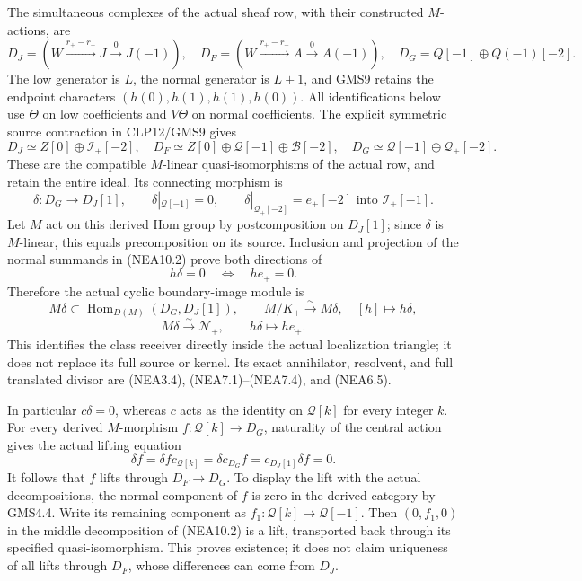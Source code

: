 The simultaneous complexes of the actual sheaf row, with their
constructed \(M\)-actions, are \[
D_J=(W\xrightarrow{r_+-r_-}J\xrightarrow0J(-1)),\quad
D_F=(W\xrightarrow{r_+-r_-}A\xrightarrow0A(-1)),\quad
D_G=Q[-1]\oplus Q(-1)[-2].
\tag{NEA10.1}
\] The low generator is \(L\), the normal generator is \(L+1\), and GMS9
retains the endpoint characters \((h(0),h(1),h(1),h(0))\). All
identifications below use \(\Theta\) on low coefficients and \(V\Theta\)
on normal coefficients. The explicit symmetric source contraction in
CLP12/GMS9 gives \[
D_J\simeq Z[0]\oplus\mathcal I_+[-2],\quad
D_F\simeq Z[0]\oplus\mathcal Q[-1]\oplus\mathcal B[-2],\quad
D_G\simeq\mathcal Q[-1]\oplus\mathcal Q_+[-2].
\tag{NEA10.2}
\] These are the compatible \(M\)-linear quasi-isomorphisms of the
actual row, and retain the entire ideal. Its connecting morphism is \[
\delta:D_G\longrightarrow D_J[1],\qquad
\delta|_{\mathcal Q[-1]}=0,\qquad
\delta|_{\mathcal Q_+[-2]}=e_+[-2]
\text{ into }\mathcal I_+[-1].
\tag{NEA10.3}
\] Let \(M\) act on this derived Hom group by postcomposition on
\(D_J[1]\); since \(\delta\) is \(M\)-linear, this equals precomposition
on its source. Inclusion and projection of the normal summands in
(NEA10.2) prove both directions of \[
h\delta=0\quad\Longleftrightarrow\quad h e_+=0.
\tag{NEA10.4}
\] Therefore the actual cyclic boundary-image module is \[
M\delta\subset\operatorname{Hom}_{D(M)}(D_G,D_J[1]),\qquad
M/K_+\xrightarrow{\sim}M\delta,\quad[h]\mapsto h\delta,
\] \[
M\delta\xrightarrow{\sim}\mathscr N_+,
\qquad h\delta\longmapsto h e_+.
\tag{NEA10.5}
\] This identifies the class receiver directly inside the actual
localization triangle; it does not replace its full source or kernel.
Its exact annihilator, resolvent, and full translated divisor are
(NEA3.4), (NEA7.1)--(NEA7.4), and (NEA6.5).

In particular \(c\delta=0\), whereas \(c\) acts as the identity on
\(\mathcal Q[k]\) for every integer \(k\). For every derived
\(M\)-morphism \(f:\mathcal Q[k]\to D_G\), naturality of the central
action gives the actual lifting equation \[
\delta f
=\delta f c_{\mathcal Q[k]}
=\delta c_{D_G}f
=c_{D_J[1]}\delta f
=0.
\tag{NEA10.6}
\] It follows that \(f\) lifts through \(D_F\to D_G\). To display the
lift with the actual decompositions, the normal component of \(f\) is
zero in the derived category by GMS4.4. Write its remaining component as
\(f_1:\mathcal Q[k]\to\mathcal Q[-1]\). Then \((0,f_1,0)\) in the middle
decomposition of (NEA10.2) is a lift, transported back through its
specified quasi-isomorphism. This proves existence; it does not claim
uniqueness of all lifts through \(D_F\), whose differences can come from
\(D_J\).

